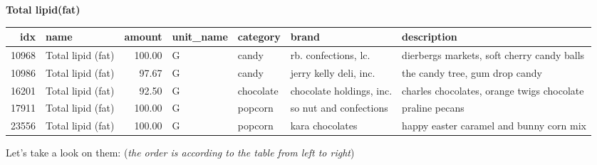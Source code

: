 \documentclass[
]{article}
\newenvironment{Shaded}{\begin{snugshade}}{\end{snugshade}}
\newcommand{\DecValTok}[1]{\textcolor[rgb]{0.00,0.00,0.81}{#1}}
\newcommand{\KeywordTok}[1]{\textcolor[rgb]{0.13,0.29,0.53}{\textbf{#1}}}
\newcommand{\NormalTok}[1]{#1}
\newcommand{\OperatorTok}[1]{\textcolor[rgb]{0.81,0.36,0.00}{\textbf{#1}}}
\newcommand{\StringTok}[1]{\textcolor[rgb]{0.31,0.60,0.02}{#1}}
\begin{document}
\textbf{Total lipid(fat)}

\begin{Shaded}
\end{Shaded}

\begin{table}[H]
\centering\begingroup\fontsize{8}{10}\selectfont

\begin{tabular}{rlrllll}
\toprule
idx & name & amount & unit\_name & category & brand & description\\
\midrule
\rowcolor{gray!6}  10968 & Total lipid (fat) & 100.00 & G & candy & rb. confections, lc. & dierbergs markets, soft cherry candy balls\\
10986 & Total lipid (fat) & 97.67 & G & candy & jerry kelly deli, inc. & the candy tree, gum drop candy\\
\rowcolor{gray!6}  16201 & Total lipid (fat) & 92.50 & G & chocolate & chocolate holdings, inc. & charles chocolates, orange twigs chocolate\\
17911 & Total lipid (fat) & 100.00 & G & popcorn & so nut and confections & praline pecans\\
\rowcolor{gray!6}  23556 & Total lipid (fat) & 100.00 & G & popcorn & kara chocolates & happy easter caramel and bunny corn mix\\
\bottomrule
\end{tabular}
\endgroup{}
\end{table}

Let's take a look on them: (\emph{the order is according to the table
from left to right})

\begin{Shaded}
\end{Shaded}
\end{document}
